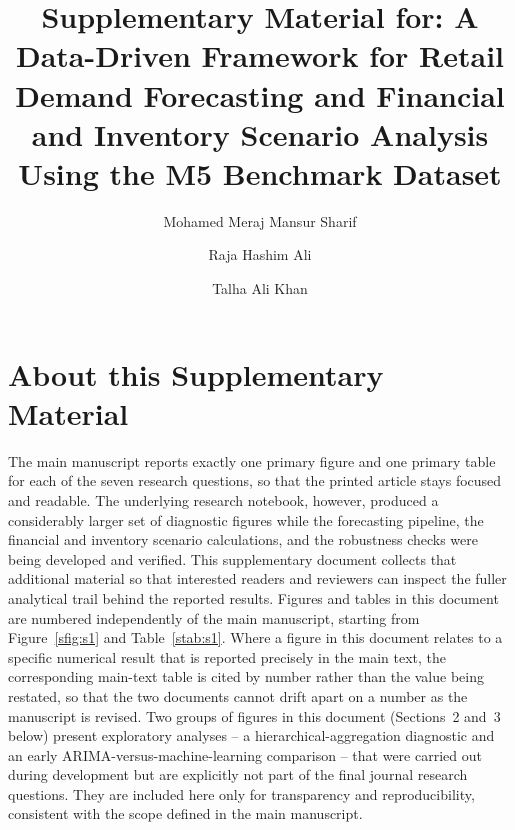 \documentclass[preprint,12pt]{elsarticle}
\begin{document}
\begin{frontmatter}

\title{Supplementary Material for: A Data-Driven Framework for Retail Demand Forecasting and Financial and Inventory Scenario Analysis Using the M5 Benchmark Dataset}

\author[label1]{Mohamed Meraj Mansur Sharif}
\author[label1]{Raja Hashim Ali}
\author[label1]{Talha Ali Khan}


\end{frontmatter}

\section*{About this Supplementary Material}

The main manuscript reports exactly one primary figure and one primary table for each of the seven research questions, so that the printed article stays focused and readable.
The underlying research notebook, however, produced a considerably larger set of diagnostic figures while the forecasting pipeline, the financial and inventory scenario calculations, and the robustness checks were being developed and verified.
This supplementary document collects that additional material so that interested readers and reviewers can inspect the fuller analytical trail behind the reported results.
Figures and tables in this document are numbered independently of the main manuscript, starting from Figure~\ref{sfig:s1} and Table~\ref{stab:s1}.
Where a figure in this document relates to a specific numerical result that is reported precisely in the main text, the corresponding main-text table is cited by number rather than the value being restated, so that the two documents cannot drift apart on a number as the manuscript is revised.
Two groups of figures in this document (Sections~2 and~3 below) present exploratory analyses -- a hierarchical-aggregation diagnostic and an early ARIMA-versus-machine-learning comparison -- that were carried out during development but are explicitly not part of the final journal research questions.
They are included here only for transparency and reproducibility, consistent with the scope defined in the main manuscript.
\end{document}
